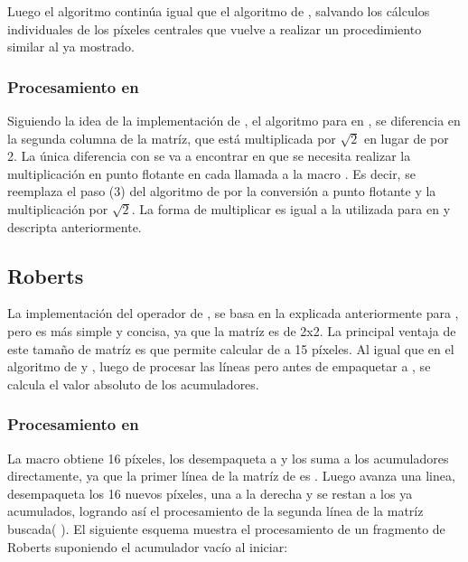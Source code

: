 Luego el algoritmo continúa igual que el algoritmo de , salvando los cálculos individuales de los píxeles centrales que vuelve a realizar 
un procedimiento similar al ya mostrado.


\subsubsection{Procesamiento en }
	Siguiendo la idea de la implementación de , el algoritmo para  en , se diferencia en la segunda 
columna de la matríz, que está multiplicada por $\sqrt{2}$ en lugar de por 2. La única diferencia con  se va a encontrar en que se 
necesita realizar la multiplicación en punto flotante en cada llamada a la macro . Es decir, se reemplaza el paso (3) del algoritmo
de  por la conversión a punto flotante y la multiplicación por $\sqrt{2}$. La forma de multiplicar es igual a la utilizada para
 en  y descripta anteriormente.


\subsection{Roberts}
La implementación del operador de , se basa en la explicada anteriormente para , pero es más simple y concisa, 
ya que la matríz es de 2x2. La principal ventaja de este tamaño de matríz es que permite calcular de a 15 píxeles. Al igual que en el algoritmo 
de  y , luego de procesar las líneas pero antes de empaquetar a , se calcula el valor absoluto 
de los acumuladores.

\subsubsection{Procesamiento en }	
	La macro  obtiene 16 píxeles, los desempaqueta a  y los suma a los acumuladores directamente, ya que la
primer línea de la matríz de  es 
. Luego avanza una linea, desempaqueta los 16 nuevos píxeles,  una  a la derecha y se restan a los ya acumulados, 
logrando así el procesamiento de la segunda línea de la matríz buscada(
). El siguiente esquema muestra el procesamiento de un fragmento de Roberts suponiendo el acumulador vacío al iniciar:

